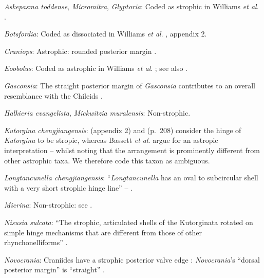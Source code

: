 \documentclass[openany]{book}
\theoremstyle{definition}
\theoremstyle{definition}
\theoremstyle{definition}
\theoremstyle{remark}
\begin{document}
\hypertarget{Askepasma_toddense-coding-68}{}
\emph{Askepasma toddense}, \emph{Micromitra}, \emph{Glyptoria}: Coded as
strophic in Williams \emph{et al}.
\citeyearpar{Williams1998Thediversity}.

\hypertarget{Botsfordia-coding-68}{}
\emph{Botsfordia}: Coded as dissociated in Williams \emph{et al}.
\citeyearpar{Williams1998Thediversity}, appendix 2.

\hypertarget{Craniops-coding-68}{}
\emph{Craniops}: Astrophic: rounded posterior margin \citep[see fig. 91
in][]{Williams2000LinguliformeaCraniiformea}.

\hypertarget{Eoobolus-coding-68}{}
\emph{Eoobolus}: Coded as astrophic in Williams \emph{et al}.
\citeyearpar{Williams1998Thediversity}; see also
\citet{Balthasar2009Thebrachiopod}.

\hypertarget{Gasconsia-coding-68}{}
\emph{Gasconsia}: The straight posterior margin of \emph{Gasconsia}
contributes to an overall resemblance with the Chileids
\citep{Holmer2014Ordovician96}.

\hypertarget{Halkieria_evangelista-coding-68}{}
\emph{Halkieria evangelista}, \emph{Mickwitzia muralensis}:
Non-strophic.

\hypertarget{Kutorgina_chengjiangensis-coding-68}{}
\emph{Kutorgina chengjiangensis}: \citet{Williams1998Thediversity}
(appendix 2) and \citet{Williams2000LinguliformeaCraniiformea} (p.~208)
consider the hinge of \emph{Kutorgina} to be stropic, whereas Bassett
\emph{et al}. \citeyearpar{Bassett2001Functionalmorphology} argue for an
astropic interpretation -- whilst noting that the arrangement is
prominently different from other astrophic taxa. We therefore code this
taxon as ambiguous.

\hypertarget{Longtancunella_chengjiangensis-coding-68}{}
\emph{Longtancunella chengjiangensis}: ``\emph{Longtancunella} has an
oval to subcircular shell with a very short strophic hinge line'' --
\citet{Zhang2011Theexceptionally}.

\hypertarget{Micrina-coding-68}{}
\emph{Micrina}: Non-strophic: see \citet{Holmer2008TheEarly}.

\hypertarget{Nisusia_sulcata-coding-68}{}
\emph{Nisusia sulcata}: ``The strophic, articulated shells of the
Kutorginata rotated on simple hinge mechanisms that are different from
those of other rhynchonelliforms''
\citep[p.~208]{Williams2000LinguliformeaCraniiformea}.

\hypertarget{Novocrania-coding-68}{}
\emph{Novocrania}: Craniides have a strophic posterior valve edge
\citep[table 39 on p.~2853]{Williams2007Supplement}: \emph{Novocrania}'s
``dorsal posterior margin'' is ``straight''
\citep[p.~171]{Williams2000LinguliformeaCraniiformea}.
\end{document}
